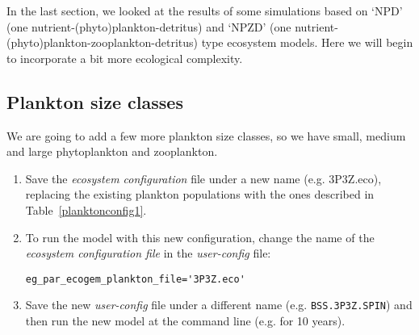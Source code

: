 \documentclass[11pt,fleqn]{book} %
\begin{document}
In the last section, we looked at the results of some simulations based on `NPD' (one nutrient-(phyto)plankton-detritus) and `NPZD' (one nutrient-(phyto)plankton-zooplankton-detritus) type ecosystem models. Here we will begin to incorporate a bit more ecological complexity.


\subsection{Plankton size classes} We are going to add a few more plankton size classes, so we have small, medium and large phytoplankton and zooplankton.

\begin{enumerate}[noitemsep]
\vspace{1mm}
\item Save the \textit{ecosystem configuration} file under a new name (e.g. \textsf{\footnotesize 3P3Z.eco}), replacing the existing plankton populations with the ones described in Table~\ref{planktonconfig1}.
\vspace{1mm}
\item  To run the model with this new configuration, change the name of the \textit{ecosystem configuration file} in the \textit{user-config} file:
\vspace{-1mm}\begin{verbatim}
eg_par_ecogem_plankton_file='3P3Z.eco'
\end{verbatim}\vspace{-1mm}
\vspace{1mm}
\item Save the new \textit{user-config} file under a different name (e.g. \texttt{BSS.3P3Z.SPIN}) and then run the new model at the command line (e.g. for 10 years).
\end{enumerate}
\vspace{2mm}
\end{document}
